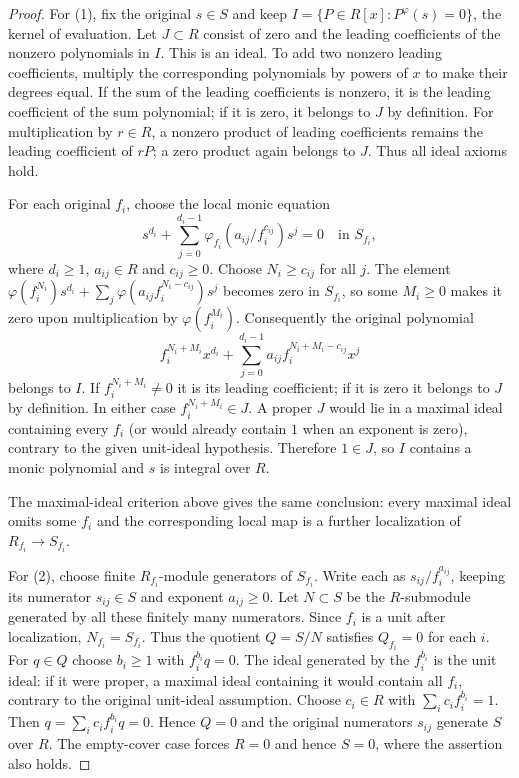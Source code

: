 \begin{proof}
For (1), fix the original $s\in S$ and keep
$I=\{P\in R[x]:P^\varphi(s)=0\}$, the kernel of evaluation.
Let $J\subset R$ consist of zero and the leading coefficients
of the nonzero polynomials in $I$. This is an ideal. To add two
nonzero leading coefficients, multiply the corresponding polynomials
by powers of $x$ to make their degrees equal. If the sum of the
leading coefficients is nonzero, it is the leading coefficient of
the sum polynomial; if it is zero, it belongs to $J$ by definition.
For multiplication by $r\in R$, a nonzero product of leading
coefficients remains the leading coefficient of $rP$; a zero
product again belongs to $J$. Thus all ideal axioms hold.

For each original $f_i$, choose the local monic equation
$$
s^{d_i}+\sum_{j=0}^{d_i-1}
\varphi_{f_i}(a_{ij}/f_i^{c_{ij}})s^j=0
\quad\text{in }S_{f_i},
$$
where $d_i\geq1$, $a_{ij}\in R$ and $c_{ij}\geq0$.
Choose $N_i\geq c_{ij}$ for all $j$. The element
$\varphi(f_i^{N_i})s^{d_i}+
\sum_j\varphi(a_{ij}f_i^{N_i-c_{ij}})s^j$ becomes zero in
$S_{f_i}$, so some $M_i\geq0$ makes it zero upon multiplication
by $\varphi(f_i^{M_i})$. Consequently the original polynomial
$$
f_i^{N_i+M_i}x^{d_i}
+\sum_{j=0}^{d_i-1}a_{ij}f_i^{N_i+M_i-c_{ij}}x^j
$$
belongs to $I$. If $f_i^{N_i+M_i}\ne0$ it is its leading
coefficient; if it is zero it belongs to $J$ by definition.
In either case $f_i^{N_i+M_i}\in J$. A proper $J$ would lie
in a maximal ideal containing every $f_i$ (or would already
contain $1$ when an exponent is zero), contrary to the given
unit-ideal hypothesis. Therefore $1\in J$, so $I$ contains a
monic polynomial and $s$ is integral over $R$.

The maximal-ideal criterion above gives the same conclusion:
every maximal ideal omits some $f_i$ and the corresponding local
map is a further localization of $R_{f_i}\to S_{f_i}$.

For (2), choose finite $R_{f_i}$-module generators of $S_{f_i}$.
Write each as $s_{ij}/f_i^{a_{ij}}$, keeping its numerator
$s_{ij}\in S$ and exponent $a_{ij}\geq0$.
Let $N\subset S$ be the $R$-submodule generated by all these
finitely many numerators. Since $f_i$ is a unit after localization,
$N_{f_i}=S_{f_i}$. Thus the quotient $Q=S/N$ satisfies $Q_{f_i}=0$
for each $i$. For $q\in Q$ choose $b_i\geq1$ with $f_i^{b_i}q=0$.
The ideal generated by the $f_i^{b_i}$ is the unit ideal: if it were
proper, a maximal ideal containing it would contain all $f_i$,
contrary to the original unit-ideal assumption. Choose $c_i\in R$
with $\sum_i c_if_i^{b_i}=1$. Then
$q=\sum_i c_if_i^{b_i}q=0$. Hence $Q=0$ and the original numerators
$s_{ij}$ generate $S$ over $R$. The empty-cover case forces $R=0$
and hence $S=0$, where the assertion also holds.
\end{proof}


